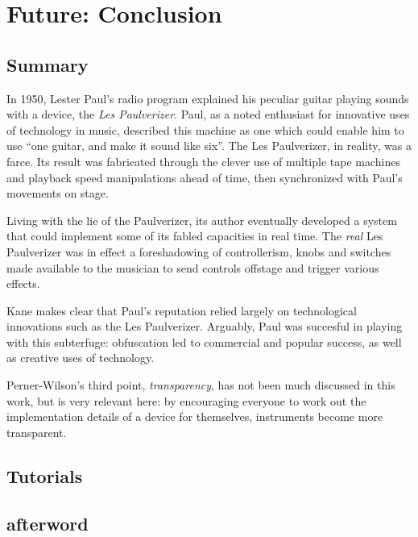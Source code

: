 \chapter{Future: Conclusion}\label{conclusion}
 
\section{Summary}

In 1950, Lester Paul's radio program explained his peculiar guitar playing sounds with a device, the \emph{Les Paulverizer}. Paul, as a noted enthusiast for innovative uses of technology in music, described this machine as one which could enable him to use ``one guitar, and make it sound like six''. The Les Paulverizer, in reality, was a farce. Its result was fabricated through the clever use of multiple tape machines and playback speed manipulations ahead of time, then synchronized with Paul's movements on stage. 

Living with the lie of the Paulverizer, its author eventually developed a system that could implement some of its fabled capacities in real time. The \emph{real} Les Paulverizer was in effect a foreshadowing of controllerism, knobs and switches made available to the musician to send controls offstage and trigger various effects\citep{kane2014}. 

Kane makes clear that Paul's reputation relied largely on technological innovations such as the Les Paulverizer. Arguably, Paul was succesful in playing with this subterfuge: obfuscation led to commercial and popular success, as well as creative uses of technology. 

Perner-Wilson's third point, \emph{transparency}, has not been much discussed in this work, but is very relevant here: by encouraging everyone to work out the implementation details of a device for themselves, instruments become more transparent.  

\section{Tutorials}


\section{afterword}


